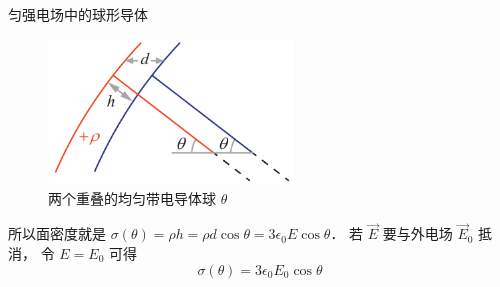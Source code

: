 \begin{exam}{匀强电场中的球形导体}
\begin{figure}[ht]
\centering
\includegraphics[width=6.5cm]{./figures/Cndctr2.pdf}
\caption{两个重叠的均匀带电导体球 $\theta$} \label{Cndctr_fig2}
\end{figure}

所以面密度就是 $\sigma(\theta) = \rho h = \rho d\cos\theta = 3\epsilon_0 E \cos\theta$． 若 $\vec E$ 要与外电场 $\vec E_0$ 抵消， 令 $E = E_0$ 可得
\begin{equation}
\sigma(\theta) = 3\epsilon_0 E_0 \cos\theta
\end{equation}
\end{exam}

